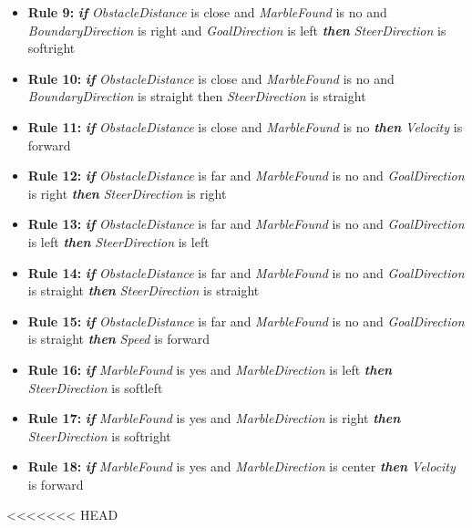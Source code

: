 \documentclass[../Head/Main.tex]{subfiles}
\begin{document}
\begin{itemize}
\item {\large \textbf{Rule 9:}} \textbf{\textit{if}} \textit{ObstacleDistance} is close and \textit{MarbleFound} is no and \textit{BoundaryDirection} is right and \textit{GoalDirection} is left \textbf{\textit{then}} \textit{SteerDirection} is softright
 
\item {\large \textbf{Rule 10:}} \textbf{\textit{if}} \textit{ObstacleDistance} is close and \textit{MarbleFound} is no and \textit{BoundaryDirection} is straight then \textit{SteerDirection} is straight

\item {\large \textbf{Rule 11:}} \textbf{\textit{if}} \textit{ObstacleDistance} is close and \textit{MarbleFound} is no \textbf{\textit{then}} \textit{Velocity} is forward

\item {\large \textbf{Rule 12:}} \textbf{\textit{if}} \textit{ObstacleDistance} is far and \textit{MarbleFound} is no and \textit{GoalDirection} is right \textbf{\textit{then}} \textit{SteerDirection} is right

\item {\large \textbf{Rule 13:}} \textbf{\textit{if}} \textit{ObstacleDistance} is far and \textit{MarbleFound} is no and \textit{GoalDirection} is left \textbf{\textit{then}} \textit{SteerDirection} is left

\item {\large \textbf{Rule 14:}} \textbf{\textit{if}} \textit{ObstacleDistance} is far and \textit{MarbleFound} is no and \textit{GoalDirection} is straight \textbf{\textit{then}} \textit{SteerDirection} is straight
 
\item {\large \textbf{Rule 15:}} \textbf{\textit{if}} \textit{ObstacleDistance} is far and \textit{MarbleFound} is no and \textit{GoalDirection} is straight \textbf{\textit{then}} \textit{Speed} is forward

\item {\large \textbf{Rule 16:}} \textbf{\textit{if}} \textit{MarbleFound} is yes and \textit{MarbleDirection} is left \textbf{\textit{then}} \textit{SteerDirection} is softleft

\item {\large \textbf{Rule 17:}} \textbf{\textit{if}} \textit{MarbleFound} is yes and \textit{MarbleDirection} is right \textbf{\textit{then}} \textit{SteerDirection} is softright
 
\item {\large \textbf{Rule 18:}} \textbf{\textit{if}} \textit{MarbleFound} is yes and \textit{MarbleDirection} is center \textbf{\textit{then}} \textit{Velocity} is forward
\end{itemize}
<<<<<<< HEAD
\end{document}
